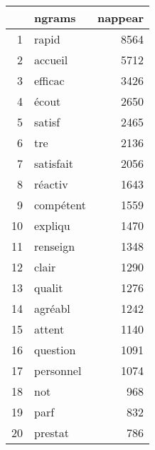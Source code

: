 \begin{tabular}{|r|l|r|}
  \hline
 & ngrams & nappear \\ 
  \hline
1 & rapid & 8564 \\ 
  2 & accueil & 5712 \\ 
  3 & efficac & 3426 \\ 
  4 & écout & 2650 \\ 
  5 & satisf & 2465 \\ 
  6 & tre & 2136 \\ 
  7 & satisfait & 2056 \\ 
  8 & réactiv & 1643 \\ 
  9 & compétent & 1559 \\ 
  10 & expliqu & 1470 \\ 
  11 & renseign & 1348 \\ 
  12 & clair & 1290 \\ 
  13 & qualit & 1276 \\ 
  14 & agréabl & 1242 \\ 
  15 & attent & 1140 \\ 
  16 & question & 1091 \\ 
  17 & personnel & 1074 \\ 
  18 & not & 968 \\ 
  19 & parf & 832 \\ 
  20 & prestat & 786 \\ 
   \hline
\end{tabular}
